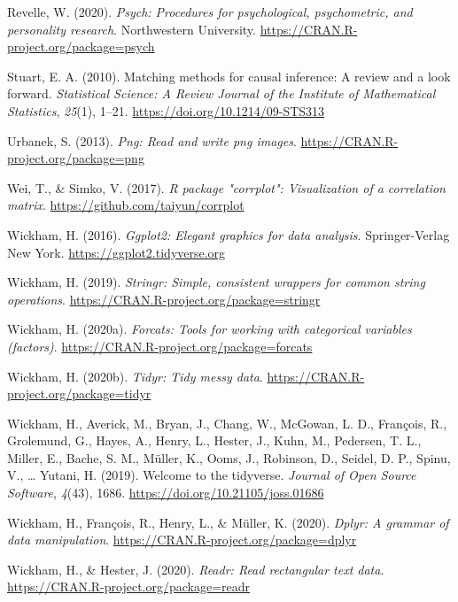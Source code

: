 \begin{appendix}
\leavevmode\hypertarget{ref-R-psych}{}%
Revelle, W. (2020). \emph{Psych: Procedures for psychological,
psychometric, and personality research}. Northwestern University.
\url{https://CRAN.R-project.org/package=psych}

\leavevmode\hypertarget{ref-stuartMatchingMethodsCausal2010}{}%
Stuart, E. A. (2010). Matching methods for causal inference: A review
and a look forward. \emph{Statistical Science: A Review Journal of the
Institute of Mathematical Statistics}, \emph{25}(1), 1--21.
\url{https://doi.org/10.1214/09-STS313}

\leavevmode\hypertarget{ref-R-png}{}%
Urbanek, S. (2013). \emph{Png: Read and write png images}.
\url{https://CRAN.R-project.org/package=png}

\leavevmode\hypertarget{ref-R-corrplot2017}{}%
Wei, T., \& Simko, V. (2017). \emph{R package "corrplot": Visualization
of a correlation matrix}. \url{https://github.com/taiyun/corrplot}

\leavevmode\hypertarget{ref-R-ggplot2}{}%
Wickham, H. (2016). \emph{Ggplot2: Elegant graphics for data analysis}.
Springer-Verlag New York. \url{https://ggplot2.tidyverse.org}

\leavevmode\hypertarget{ref-R-stringr}{}%
Wickham, H. (2019). \emph{Stringr: Simple, consistent wrappers for
common string operations}.
\url{https://CRAN.R-project.org/package=stringr}

\leavevmode\hypertarget{ref-R-forcats}{}%
Wickham, H. (2020a). \emph{Forcats: Tools for working with categorical
variables (factors)}. \url{https://CRAN.R-project.org/package=forcats}

\leavevmode\hypertarget{ref-R-tidyr}{}%
Wickham, H. (2020b). \emph{Tidyr: Tidy messy data}.
\url{https://CRAN.R-project.org/package=tidyr}

\leavevmode\hypertarget{ref-R-tidyverse}{}%
Wickham, H., Averick, M., Bryan, J., Chang, W., McGowan, L. D.,
François, R., Grolemund, G., Hayes, A., Henry, L., Hester, J., Kuhn, M.,
Pedersen, T. L., Miller, E., Bache, S. M., Müller, K., Ooms, J.,
Robinson, D., Seidel, D. P., Spinu, V., \ldots{} Yutani, H. (2019).
Welcome to the tidyverse. \emph{Journal of Open Source Software},
\emph{4}(43), 1686. \url{https://doi.org/10.21105/joss.01686}

\leavevmode\hypertarget{ref-R-dplyr}{}%
Wickham, H., François, R., Henry, L., \& Müller, K. (2020). \emph{Dplyr:
A grammar of data manipulation}.
\url{https://CRAN.R-project.org/package=dplyr}

\leavevmode\hypertarget{ref-R-readr}{}%
Wickham, H., \& Hester, J. (2020). \emph{Readr: Read rectangular text
data}. \url{https://CRAN.R-project.org/package=readr}


\end{appendix}
